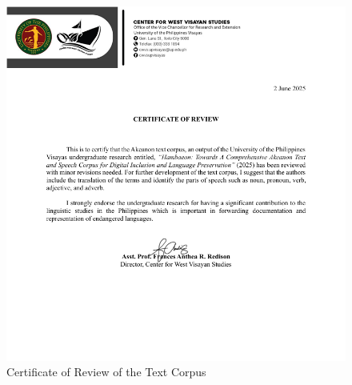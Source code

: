 \begin{figure}[h!]
	\centering
	\includegraphics[width=\textwidth]{./appendix/certificate-of-review.png}
	\caption{Certificate of Review of the Text Corpus}
	\label{fig:swadeshBuruanganon}
\end{figure}